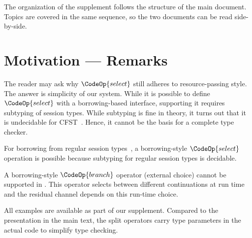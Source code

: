 \newcommand\linenoreset[1][1]{%
  \defcounter{lineno@num}{#1 - 1}%
}

\EndFmtInput















\appendix


The organization of the supplement follows the structure of the main document.
Topics are covered in the same sequence, so the two documents can be read
side-by-side.


\section{Motivation --- Remarks}
\label{sec:remarks}


{\BorrowCodeStyle

The reader may ask why \ensuremath{\CodeOp{select}} still adheres to
resource-passing style. The answer is simplicity of our system. While it
is possible to define \ensuremath{\CodeOp{select}} with a borrowing-based
interface, supporting it requires subtyping of session types. While
subtyping is fine in theory, it turns out that it is undecidable for
CFST~\cite{DBLP:journals/toplas/Padovani19}. Hence, it cannot be the
basis for a complete type checker.

For borrowing from regular session
types~\cite{DBLP:journals/pacmpl/SaffrichS0V25}, a borrowing-style
\ensuremath{\CodeOp{select}} operation is possible because subtyping for regular
session types is decidable.

A borrowing-style \ensuremath{\CodeOp{branch}} operator (external choice) cannot be supported in \thecalculus.
This operator selects between different continuations at run time and
the residual channel depends on this run-time choice.


All \thecalculus examples are available as part of our supplement. Compared to the
presentation in the main text, the split operators carry type
parameters in the actual code to simplify type checking.

}


